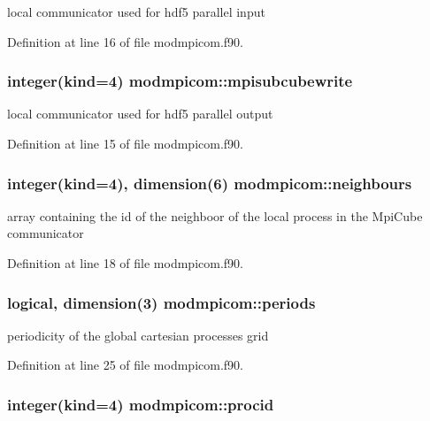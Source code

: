 local communicator used for hdf5 parallel input 



Definition at line 16 of file modmpicom.\-f90.

\hypertarget{classmodmpicom_aa950234af9f6bdf930d8c4e61a76ca96}{
\subsubsection[{mpisubcubewrite}]{\setlength{\rightskip}{0pt plus 5cm}integer(kind=4) modmpicom\-::mpisubcubewrite}}\label{classmodmpicom_aa950234af9f6bdf930d8c4e61a76ca96}


local communicator used for hdf5 parallel output 



Definition at line 15 of file modmpicom.\-f90.

\hypertarget{classmodmpicom_a818e6dbfc3705e5d5bddb752f2aeb5aa}{
\subsubsection[{neighbours}]{\setlength{\rightskip}{0pt plus 5cm}integer(kind=4), dimension(6) modmpicom\-::neighbours}}\label{classmodmpicom_a818e6dbfc3705e5d5bddb752f2aeb5aa}


array containing the id of the neighboor of the local process in the Mpi\-Cube communicator 



Definition at line 18 of file modmpicom.\-f90.

\hypertarget{classmodmpicom_a57d5edb2a6734b602fe2d3d3c19cd1f9}{
\subsubsection[{periods}]{\setlength{\rightskip}{0pt plus 5cm}logical, dimension(3) modmpicom\-::periods}}\label{classmodmpicom_a57d5edb2a6734b602fe2d3d3c19cd1f9}


periodicity of the global cartesian processes grid 



Definition at line 25 of file modmpicom.\-f90.

\hypertarget{classmodmpicom_a0a592a5f03c3c0d61e07b5a56fd161d1}{
\subsubsection[{procid}]{\setlength{\rightskip}{0pt plus 5cm}integer(kind=4) modmpicom\-::procid}}\label{classmodmpicom_a0a592a5f03c3c0d61e07b5a56fd161d1}


